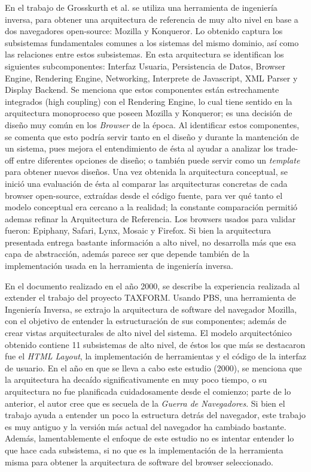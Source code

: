 \documentclass{sig-alternate-05-2015}
\begin{document}
  En el trabajo de Grosskurth et al. \cite{2005-grosskurth-browser-refarch, preprint-grosskurth-browser-archevol} se utiliza una herramienta de ingeniería inversa, para obtener una arquitectura de referencia de muy alto nivel en base a dos navegadores open-source: Mozilla y Konqueror. Lo obtenido captura los subsistemas fundamentales comunes a los sistemas del mismo dominio, así como las relaciones entre estos subsistemas. En esta arquitectura se identifican los siguientes subcomponentes: Interfaz Usuaria, Persistencia de Datos, Browser Engine, Rendering Engine, Networking, Interprete de Javascript, XML Parser y Display Backend. Se menciona que estos componentes están estrechamente integrados (high coupling) con el Rendering Engine, lo cual tiene sentido en la arquitectura monoproceso que poseen Mozilla y Konqueror; es una decisión de diseño muy común en los \textit{Browser} de la época. Al identificar estos componentes, se comenta que esto podría servir tanto en el diseño y durante la mantención de un sistema, pues mejora el entendimiento de ésta al ayudar a analizar los trade-off entre diferentes opciones de diseño; o también puede servir como un \textit{template} para obtener nuevos diseños. Una vez obtenida la arquitectura conceptual, se inició una evaluación de ésta al comparar las arquitecturas concretas de cada browser open-source, extraídas desde el código fuente, para ver qué tanto el modelo conceptual era cercano a la realidad; la constante comparación permitió ademas refinar la Arquitectura de Referencia. Los browsers usados para validar fueron: Epiphany, Safari, Lynx, Mosaic y Firefox. Si bien la arquitectura presentada entrega bastante información a alto nivel, no desarrolla más que esa capa de abstracción, además parece ser que depende también de la implementación usada en la herramienta de ingeniería inversa. 

  En el documento \cite{Godfrey2000} realizado en el año 2000, se describe la experiencia realizada al extender el trabajo del proyecto TAXFORM. Usando PBS, una herramienta de Ingeniería Inversa, se extrajo la arquitectura de software del navegador Mozilla, con el objetivo de entender la estructuración de sus componentes; además de crear vistas arquitecturales de alto nivel del sistema. El modelo arquitectónico obtenido contiene 11 subsistemas de alto nivel, de éstos los que más se destacaron fue el \textit{HTML Layout}, la implementación de herramientas y el código de la interfaz de usuario. En el año en que se lleva a cabo este estudio (2000), se menciona que la arquitectura ha decaído significativamente en muy poco tiempo, o su arquitectura no fue planificada cuidadosamente desde el comienzo; parte de lo anterior, el autor cree que es secuela de la \textit{Guerra de Navegadores}. Si bien el trabajo ayuda a entender un poco la estructura detrás del navegador, este trabajo es muy antiguo y la versión más actual del navegador ha cambiado bastante. Además, lamentablemente el enfoque de este estudio no es intentar entender lo que hace cada subsistema, si no que es la implementación de la herramienta misma para obtener la arquitectura de software del browser seleccionado.
\end{document}
